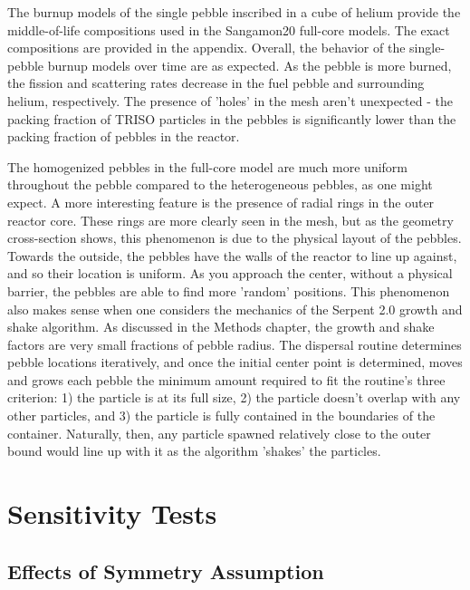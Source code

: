 The burnup models of the single pebble inscribed in a cube of helium provide the middle-of-life compositions used in the Sangamon20 full-core models.  The exact compositions are provided in the appendix.  Overall, the behavior of the single-pebble burnup models over time are as expected.  As the pebble is more burned, the fission and scattering rates decrease in the fuel pebble and surrounding helium, respectively.  The presence of 'holes' in the mesh aren't unexpected - the packing fraction of TRISO particles in the pebbles is significantly lower than the packing fraction of pebbles in the reactor.

The homogenized pebbles in the full-core model are much more uniform throughout the pebble compared to the heterogeneous pebbles, as one might expect.  A more interesting feature is the presence of radial rings in the outer reactor core.  These rings are more clearly seen in the mesh, but as the geometry cross-section shows, this phenomenon is due to the physical layout of the pebbles.  Towards the outside, the pebbles have the walls of the reactor to line up against, and so their location is uniform.  As you approach the center, without a physical barrier, the pebbles are able to find more 'random' positions.  This phenomenon also makes sense when one considers the mechanics of the Serpent 2.0 growth and shake algorithm.  As discussed in the Methods chapter, the growth and shake factors are very small fractions of pebble radius.  The dispersal routine determines pebble locations iteratively, and once the initial center point is determined, moves and grows each pebble the minimum amount required to fit the routine's three criterion:  1) the particle is at its full size, 2) the particle doesn't overlap with any other particles,  and 3) the particle is fully contained in the boundaries of the container.  Naturally, then, any particle spawned relatively close to the outer bound would line up with it as the algorithm 'shakes' the particles.




\section{Sensitivity Tests}

\subsection{Effects of Symmetry Assumption}

